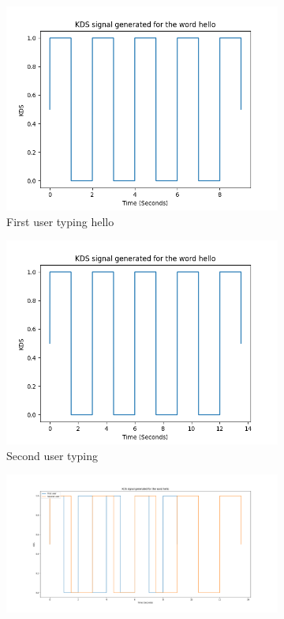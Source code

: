 \documentclass[10pt,a4paper]{report}
\begin{document}
\begin{figure}
	\centering
	\begin{subfigure}[b]{0.3\textwidth}
		\centering
		\includegraphics[width=\textwidth]{KDS1}
		\caption{First user typing hello}
		\label{fig:KDS1}
	\end{subfigure}
	\hfill
	\begin{subfigure}[b]{0.3\textwidth}
		\centering
		\includegraphics[width=\textwidth]{KDS2}
		\caption{Second user typing}
		\label{fig:KDS2}
	\end{subfigure}
	\hfill
	\begin{subfigure}[b]{0.3\textwidth}
		\centering
		\includegraphics[width=\textwidth]{KDSBoth}

\end{subfigure}
\end{figure}
\end{document}
